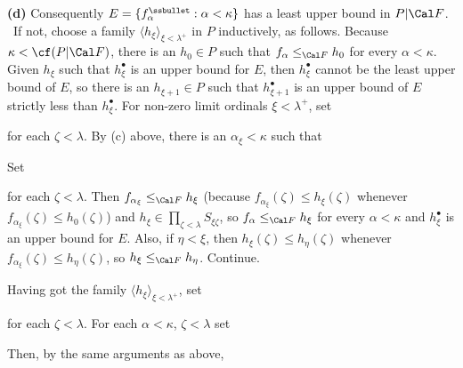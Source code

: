 {{\bf (d)} Consequently
$E=\{f_{\alpha}^{\ssbullet}:\alpha<\kappa\}$
has a least upper bound in $P|\Cal F$.   \Prf\Quer\
If not, choose a family
$\langle h_{\xi}\rangle_{\xi<\lambda^+}$ in $P$ inductively,
as follows.   Because $\kappa<\cf(P|\Cal F)$, there is an
$h_0\in P$ such that
$f_{\alpha}\le_{\Cal F}h_0$ for every $\alpha<\kappa$.   Given
$h_{\xi}$
such that $h_{\xi}^{\bullet}$ is an upper bound
for $E$, then $h_{\xi}^{\bullet}$ cannot be the least upper bound of
$E$, so there is an $h_{\xi+1}\in P$ such that $h_{\xi+1}^{\bullet}$
is an upper bound of $E$ strictly less than $h_{\xi}^{\bullet}$.
For non-zero limit ordinals $\xi<\lambda^+$, set


\noindent for each $\zeta<\lambda$.   By (c) above, there is an
$\alpha_{\xi}<\kappa$ such that


\noindent Set


\noindent for each $\zeta<\lambda$.   Then
$f_{\alpha_{\xi}}\le_{\Cal F}h_{\xi}$ (because
$f_{\alpha_{\xi}}(\zeta)\le h_{\xi}(\zeta)$ whenever
$f_{\alpha_{\xi}}(\zeta)\le h_0(\zeta)$) and
$h_{\xi}\in\prod_{\zeta<\lambda}S_{\xi\zeta}$, so
$f_{\alpha}\le_{\Cal F}h_{\xi}$ for every $\alpha<\kappa$ and
$h_{\xi}^{\bullet}$ is an upper bound for $E$.   Also, if
$\eta<\xi$, then $h_{\xi}(\zeta)\le h_{\eta}(\zeta)$ whenever
$f_{\alpha_{\xi}}(\zeta)\le h_{\eta}(\zeta)$, so $h_{\xi}\le_{\Cal F}
h_{\eta}$.   Continue.

Having got the family $\langle h_{\xi}\rangle_{\xi<\lambda^+}$, set


\noindent for each $\zeta<\lambda$.   For each $\alpha<\kappa$,
$\zeta<\lambda$ set


\noindent Then, by the same arguments as above,


}
